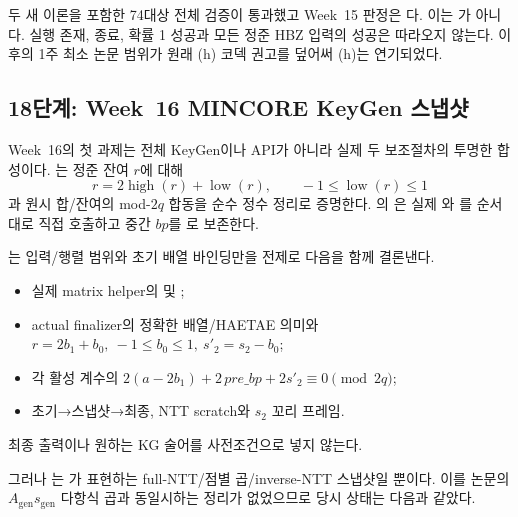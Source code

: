 두 새 이론을 포함한 74대상 전체 검증이 통과했고 Week~15 판정은
다. 이는 가 아니다.
실행 존재, 종료, 확률 1 성공과 모든 정준 HBZ 입력의 성공은 따라오지 않는다.
이후의 1주 최소 논문 범위가 원래 (h) 코덱 권고를 덮어써 (h)는 연기되었다.

\subsection{18단계: Week~16 MINCORE KeyGen 스냅샷}

Week~16의 첫 과제는 전체 KeyGen이나 API가 아니라 실제 두 보조절차의 투명한
합성이다. 는 정준 잔여 \(r\)에 대해
\[
  r=2\operatorname{high}(r)+\operatorname{low}(r),\qquad
  -1\le\operatorname{low}(r)\le1
\]
과 원시 합/잔여의 mod-\(2q\) 합동을 순수 정수 정리로 증명한다.
의
은 실제
와 를 순서대로
직접 호출하고 중간 \(bp\)를 로 보존한다.

\begin{verified}
\label{thm:actual-keygen-snapshot}
는 입력/행렬 범위와
초기 배열 바인딩만을 전제로 다음을 함께 결론낸다.
\begin{itemize}
  \item 실제 matrix helper의  및
        ;
  \item actual finalizer의 정확한 배열/HAETAE 의미와
        \(r=2b_1+b_0,\ -1\le b_0\le1,\ s'_2=s_2-b_0\);
  \item 각 활성 계수의
        \(2(a-2b_1)+2\,pre\_bp+2s'_2\equiv0\pmod{2q}\);
  \item 초기→스냅샷→최종, NTT scratch와 \(s_2\) 꼬리 프레임.
\end{itemize}
최종 출력이나 원하는 KG 술어를 사전조건으로 넣지 않는다.
\end{verified}

그러나 는
가 표현하는 full-NTT/점별
곱/inverse-NTT 스냅샷일 뿐이다. 이를 논문의
\(A_{\mathrm{gen}}s_{\mathrm{gen}}\) 다항식 곱과 동일시하는 정리가 없었으므로
당시 상태는 다음과 같았다.

